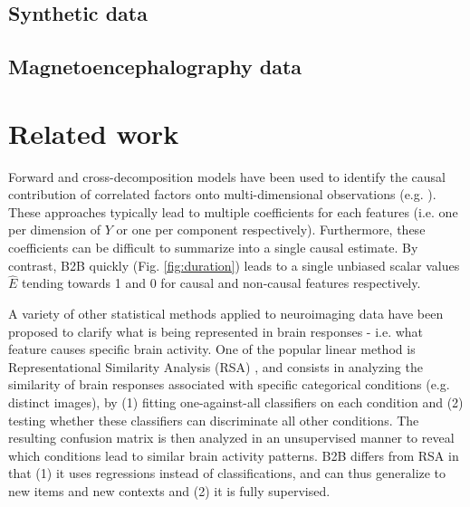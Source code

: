 \documentclass[preprint,12pt,3p]{elsarticle}
\begin{document}
\subsection{Synthetic data}
\label{sec:experiment_synthetic}




\subsection{Magnetoencephalography data}
\label{sec:experiment_real}

\section{Related work}

Forward and cross-decomposition models have been used to identify the causal
contribution of correlated factors onto multi-dimensional observations (e.g.
\citep{naselaris2011encoding}). These approaches typically lead to multiple
coefficients for each features (i.e. one per dimension of $Y$ or one per
component respectively). Furthermore, these coefficients can be difficult to
summarize into a single causal estimate. By contrast, B2B quickly (Fig.
\ref{fig:duration}) leads to a single unbiased scalar values $\hat E$ tending
towards 1 and 0 for causal and non-causal features respectively.

A variety of other statistical methods applied to neuroimaging data have been
proposed to clarify what is being represented in brain responses - i.e. what
feature causes specific brain activity. One of the popular linear method is
Representational Similarity Analysis (RSA)
\citep{kriegeskorte2008representational}, and consists in analyzing the
similarity of brain responses associated with specific categorical conditions
(e.g. distinct images), by (1) fitting one-against-all classifiers on each
condition and (2) testing whether these classifiers can discriminate all other
conditions. The resulting confusion matrix is then analyzed in an unsupervised
manner to reveal which conditions lead to similar brain activity patterns. B2B
differs from RSA in that (1) it uses regressions instead of classifications, and
can thus generalize to new items and new contexts and (2) it is fully
supervised.
\end{document}
